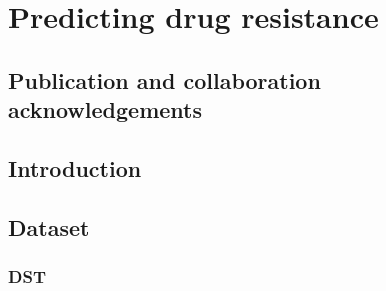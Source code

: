 \chapter{Predicting \mtb{} drug resistance}
\label{chap:dst}
\ifpdf
    \graphicspath{{Chapter3/Figs/Raster/}{Chapter3/Figs/PDF/}{Chapter3/Figs/}}
\else
    \graphicspath{{Chapter3/Figs/Vector/}{Chapter3/Figs/}}
\fi


\setcounter{section}{-1}
\section{Publication and collaboration acknowledgements}
\label{sec:ch3-acknowledge}

\section{Introduction}

\section{Dataset}

\subsection{DST}

